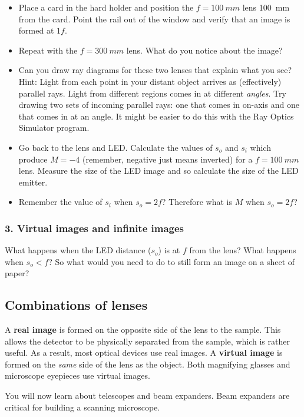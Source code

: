 \documentclass[a4paper]{report}
\begin{document}
\begin{itemize}
\item Place a card in the hard holder and position the $f=100~mm$ lens 100~mm from the card. 
Point the rail out of the window and verify that an image is formed at $1f$. 
\item Repeat with the $f=300~mm$ lens. What do you notice about the image? 
\item Can you draw ray diagrams for these two lenses that explain what you see?
Hint: Light from each point in your distant object arrives as (effectively) parallel rays. 
Light from different regions comes in at different \textit{angles}. 
Try drawing two sets of incoming parallel rays: one that comes in on-axis and one that comes in at an angle. 
It might be easier to do this with the Ray Optics Simulator program.
\item Go back to the lens and LED.
Calculate the values of $s_o$ and $s_i$ which produce $M=-4$ (remember, negative just means inverted) for a $f=100~mm$ lens. 
Measure the size of the LED image and so calculate the size of the LED emitter. 
\item Remember the value of $s_i$ when $s_o=2f$? Therefore what is $M$ when $s_o=2f$?
\end{itemize}


\subsubsection{3. Virtual images and infinite images}
What happens when the LED distance ($s_o$) is at $f$ from the lens?
What happens when $s_o<f$? 
So what would you need to do to still form an image on a sheet of paper? 


\clearpage

\subsection{Combinations of lenses}
A \textbf{real image} is formed on the opposite side of the lens to the sample. 
This allows the detector to be physically separated from the sample, which is rather useful.
As a result, most optical devices use real images. 
A \textbf{virtual image} is formed on the \textit{same} side of the lens as the object. 
Both magnifying glasses and microscope eyepieces use virtual images. 


You will now learn about telescopes and beam expanders.
Beam expanders are critical for building a scanning microscope.
\end{document}
